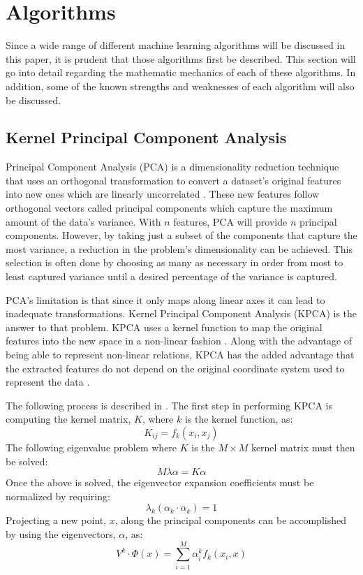 \chapter{Algorithms}
Since a wide range of different machine learning algorithms will be discussed in this paper, it is prudent that those algorithms first be described. This section will go into detail regarding the mathematic mechanics of each of these algorithms. In addition, some of the known strengths and weaknesses of each algorithm will also be discussed.



\section{Kernel Principal Component Analysis}
Principal Component Analysis (PCA) is a dimensionality reduction technique that uses an orthogonal transformation to convert a dataset's original features into new ones which are linearly uncorrelated \cite{KPCA}. These new features follow orthogonal vectors called principal components which capture the maximum amount of the data's variance. With $n$ features, PCA will provide $n$ principal components. However, by taking just a subset of the components that capture the most variance, a reduction in the problem's dimensionality can be achieved. This selection is often done by choosing as many as necessary in order from most to least captured variance until a desired percentage of the variance is captured.

PCA's limitation is that since it only maps along linear axes it can lead to inadequate transformations. Kernel Principal Component Analysis (KPCA) is the answer to that problem. KPCA uses a kernel function to map the original features into the new space in a non-linear fashion \cite{KPCA}. Along with the advantage of being able to represent non-linear relations, KPCA has the added advantage that the extracted features do not depend on the original coordinate system used to represent the data \cite{KPCA}.

The following process is described in \cite{KPCA}. The first step in performing KPCA is computing the kernel matrix, $K$, where $k$ is the kernel function, as:
$$K_{ij} = f_k(x_i, x_j)$$
The following eigenvalue problem where $K$ is the $M \times M$ kernel matrix must then be solved:
$$M \lambda \alpha = K \alpha$$
Once the above is solved, the eigenvector expansion coefficients must be normalized by requiring:
$$\lambda_k (\alpha_k \cdot \alpha_k) = 1$$
Projecting a new point, $x$, along the principal components can be accomplished by using the eigenvectors, $\alpha$, as:
$$V^k \cdot \Phi(x) = \sum\limits_{i=1}^M \alpha_i^k f_k(x_i, x)$$



